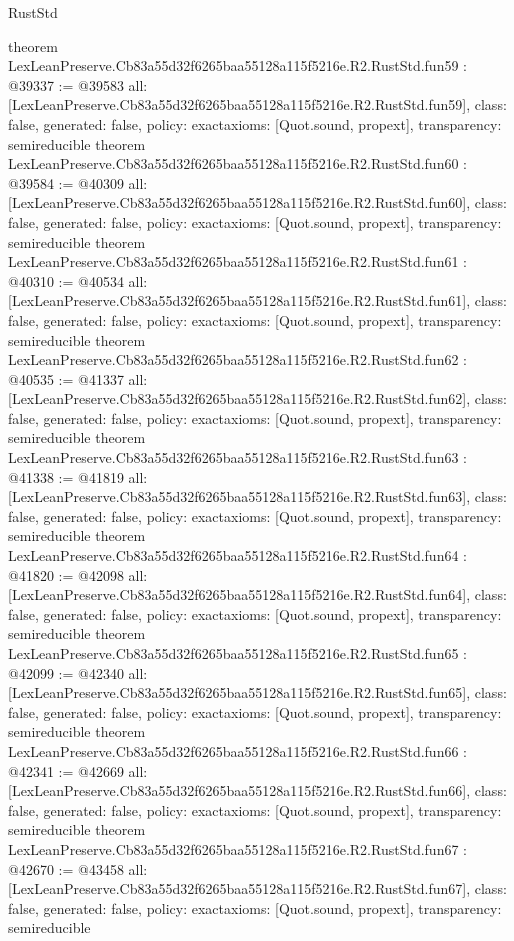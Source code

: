 \begin{lexlean}{RustStd}
\begin{coremodule}
{}
theorem LexLeanPreserve.Cb83a55d32f6265baa55128a115f5216e.R2.RustStd.fun59 : @39337 := @39583 {
  all: [LexLeanPreserve.Cb83a55d32f6265baa55128a115f5216e.R2.RustStd.fun59],
  class: false,
  generated: false,
  policy: exact{axioms: [Quot.sound, propext]},
  transparency: semireducible
}
theorem LexLeanPreserve.Cb83a55d32f6265baa55128a115f5216e.R2.RustStd.fun60 : @39584 := @40309 {
  all: [LexLeanPreserve.Cb83a55d32f6265baa55128a115f5216e.R2.RustStd.fun60],
  class: false,
  generated: false,
  policy: exact{axioms: [Quot.sound, propext]},
  transparency: semireducible
}
theorem LexLeanPreserve.Cb83a55d32f6265baa55128a115f5216e.R2.RustStd.fun61 : @40310 := @40534 {
  all: [LexLeanPreserve.Cb83a55d32f6265baa55128a115f5216e.R2.RustStd.fun61],
  class: false,
  generated: false,
  policy: exact{axioms: [Quot.sound, propext]},
  transparency: semireducible
}
theorem LexLeanPreserve.Cb83a55d32f6265baa55128a115f5216e.R2.RustStd.fun62 : @40535 := @41337 {
  all: [LexLeanPreserve.Cb83a55d32f6265baa55128a115f5216e.R2.RustStd.fun62],
  class: false,
  generated: false,
  policy: exact{axioms: [Quot.sound, propext]},
  transparency: semireducible
}
theorem LexLeanPreserve.Cb83a55d32f6265baa55128a115f5216e.R2.RustStd.fun63 : @41338 := @41819 {
  all: [LexLeanPreserve.Cb83a55d32f6265baa55128a115f5216e.R2.RustStd.fun63],
  class: false,
  generated: false,
  policy: exact{axioms: [Quot.sound, propext]},
  transparency: semireducible
}
theorem LexLeanPreserve.Cb83a55d32f6265baa55128a115f5216e.R2.RustStd.fun64 : @41820 := @42098 {
  all: [LexLeanPreserve.Cb83a55d32f6265baa55128a115f5216e.R2.RustStd.fun64],
  class: false,
  generated: false,
  policy: exact{axioms: [Quot.sound, propext]},
  transparency: semireducible
}
theorem LexLeanPreserve.Cb83a55d32f6265baa55128a115f5216e.R2.RustStd.fun65 : @42099 := @42340 {
  all: [LexLeanPreserve.Cb83a55d32f6265baa55128a115f5216e.R2.RustStd.fun65],
  class: false,
  generated: false,
  policy: exact{axioms: [Quot.sound, propext]},
  transparency: semireducible
}
theorem LexLeanPreserve.Cb83a55d32f6265baa55128a115f5216e.R2.RustStd.fun66 : @42341 := @42669 {
  all: [LexLeanPreserve.Cb83a55d32f6265baa55128a115f5216e.R2.RustStd.fun66],
  class: false,
  generated: false,
  policy: exact{axioms: [Quot.sound, propext]},
  transparency: semireducible
}
theorem LexLeanPreserve.Cb83a55d32f6265baa55128a115f5216e.R2.RustStd.fun67 : @42670 := @43458 {
  all: [LexLeanPreserve.Cb83a55d32f6265baa55128a115f5216e.R2.RustStd.fun67],
  class: false,
  generated: false,
  policy: exact{axioms: [Quot.sound, propext]},
  transparency: semireducible
}
\end{coremodule}
\end{lexlean}
